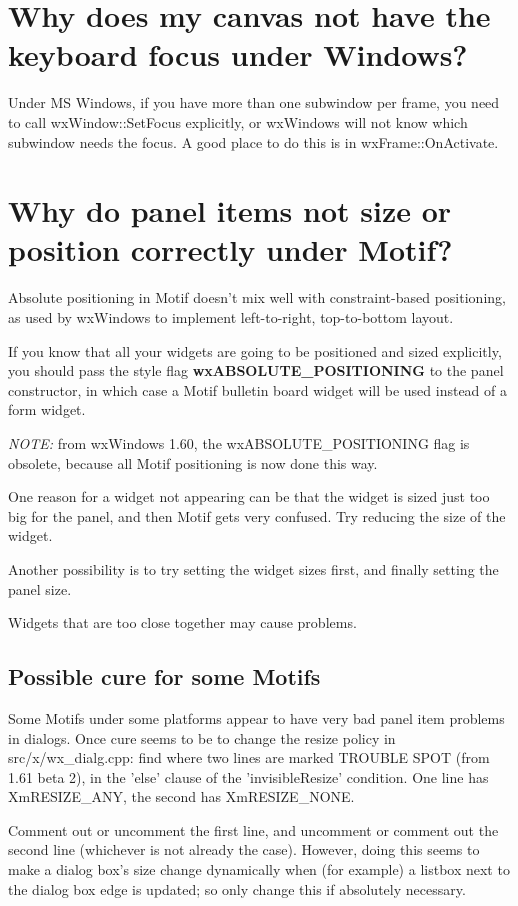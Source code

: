 \section{Why does my canvas not have the keyboard focus under Windows?}

Under MS Windows, if you have more than one subwindow per frame,
you need to call wxWindow::SetFocus explicitly, or wxWindows will not know
which subwindow needs the focus. A good place to do this is in wxFrame::OnActivate.

\section{Why do panel items not size or position correctly under Motif?}

Absolute positioning in Motif doesn't mix well with constraint-based positioning,
as used by wxWindows to implement left-to-right, top-to-bottom layout.

If you know that all your widgets are going to be positioned and sized explicitly,
you should pass the style flag {\bf wxABSOLUTE\_POSITIONING} to the panel constructor,
in which case a Motif bulletin board widget will be used instead of a form widget.

{\it NOTE:} from wxWindows 1.60, the wxABSOLUTE\_POSITIONING flag is
obsolete, because all Motif positioning is now done this way.

One reason for a widget not appearing can be that the widget
is sized just too big for the panel, and then Motif gets very
confused. Try reducing the size of the widget.

Another possibility is to try setting the widget sizes first, and
finally setting the panel size.

Widgets that are too close together may cause problems.

\subsection{Possible cure for some Motifs}

Some Motifs under some platforms appear to have very bad panel item
problems in dialogs. Once cure seems to be to change the resize policy
in src/x/wx\_dialg.cpp: find where two lines are marked TROUBLE SPOT (from 1.61 beta 2),
in the 'else' clause of the 'invisibleResize' condition. One line has XmRESIZE\_ANY,
the second has XmRESIZE\_NONE.

Comment out or uncomment the first line, and uncomment or comment out
the second line (whichever is not already the case). However, doing this
seems to make a dialog box's size change dynamically when (for example)
a listbox next to the dialog box edge is updated; so only change this if
absolutely necessary.


